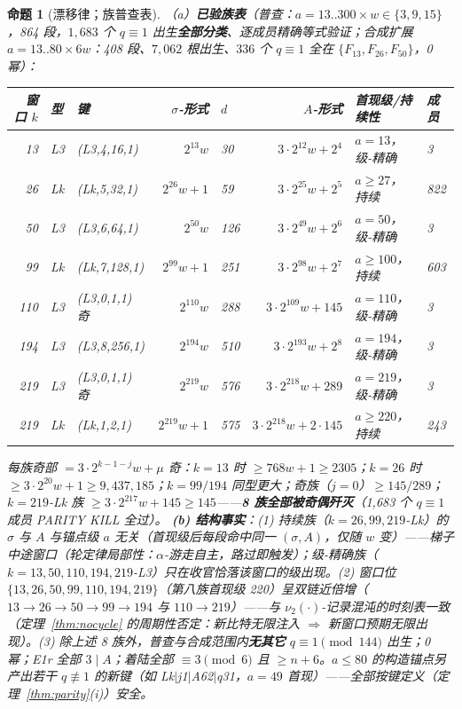 \documentclass[11pt]{ctexart}
\newtheorem{proposition}[theorem]{命题}
\theoremstyle{definition}
\newcommand{\vtwo}[1]{\nu_2(#1)}
\begin{document}
\begin{proposition}[漂移律；族普查表]\label{prop:drift}
（a）\textbf{已验族表}（普查：$a=13..300\times w\in\{3,9,15\}$，864 段，$1{,}683$ 个 $q\equiv1$ 出生\textbf{全部分类}、逐成员精确等式验证；合成扩展 $a=13..80\times6w$：408 段、$7{,}062$ 根出生、$336$ 个 $q\equiv1$ 全在 $\{F_{13},F_{26},F_{50}\}$，0 幂）：
\begin{center}\small
\begin{tabular}{rllrlrll}
\toprule
窗口 $k$ & 型 & 键 & $\sigma$-形式 & $d$ & $A$-形式 & 首现级/持续性 & 成员\\
\midrule
13 & L3 & (L3,4,16,1) & $2^{13}w$ & 30 & $3\cdot2^{12}w+2^4$ & $a{=}13$，级-精确 & 3\\
26 & Lk & (Lk,5,32,1) & $2^{26}w{+}1$ & 59 & $3\cdot2^{25}w+2^5$ & $a\ge27$，持续 & 822\\
50 & L3 & (L3,6,64,1) & $2^{50}w$ & 126 & $3\cdot2^{49}w+2^6$ & $a{=}50$，级-精确 & 3\\
99 & Lk & (Lk,7,128,1) & $2^{99}w{+}1$ & 251 & $3\cdot2^{98}w+2^7$ & $a\ge100$，持续 & 603\\
110 & L3 & (L3,0,1,1) 奇 & $2^{110}w$ & 288 & $3\cdot2^{109}w+145$ & $a{=}110$，级-精确 & 3\\
194 & L3 & (L3,8,256,1) & $2^{194}w$ & 510 & $3\cdot2^{193}w+2^8$ & $a{=}194$，级-精确 & 3\\
219 & L3 & (L3,0,1,1) 奇 & $2^{219}w$ & 576 & $3\cdot2^{218}w+289$ & $a{=}219$，级-精确 & 3\\
219 & Lk & (Lk,1,2,1) & $2^{219}w{+}1$ & 575 & $3\cdot2^{218}w+2\cdot145$ & $a\ge220$，持续 & 243\\
\bottomrule
\end{tabular}
\end{center}
每族奇部 $=3\cdot2^{k-1-j}w+\mu$ 奇：$k{=}13$ 时 $\ge768w+1\ge2305$；$k{=}26$ 时 $\ge3\cdot2^{20}w+1\ge9{,}437{,}185$；$k{=}99/194$ 同型更大；奇族（$j{=}0$）$\ge145/289$；$k{=}219$-Lk 族 $\ge3\cdot2^{217}w+145\ge145$——\textbf{8 族全部被奇偶歼灭}（1,683 个 $q\equiv1$ 成员 PARITY KILL 全过）。
\textbf{(b) 结构事实}：(1) 持续族（$k=26,99,219$-Lk）的 $\sigma$ 与 $A$ 与锚点级 $a$ 无关（首现级后每段命中同一 $(\sigma,A)$，仅随 $w$ 变）——梯子中途窗口（轮定律局部性：$\alpha$-游走自主，路过即触发）；级-精确族（$k=13,50,110,194,219$-L3）只在收官恰落该窗口的级出现。(2) 窗口位 $\{13,26,50,99,110,194,219\}$（第八族首现级 220）呈双链近倍增（$13\to26\to50\to99\to194$ 与 $110\to219$）——与 $\vtwo{\cdot}$-记录混沌的时刻表一致（定理~\ref{thm:nocycle} 的周期性否定：新比特无限注入 $\Rightarrow$ 新窗口预期无限出现）。(3) 除上述 8 族外，普查与合成范围内\textbf{无其它} $q\equiv1\pmod{144}$ 出生；0 幂；E1r 全部 $3\mid A$；着陆全部 $\equiv3\pmod6$ 且 $\ge n+6$。$a\le80$ 的构造锚点另产出若干 $q\not\equiv1$ 的新键（如 Lk$|$j1$|$A62$|$q31，$a{=}49$ 首现）——全部按键定义（定理~\ref{thm:parity}(i)）安全。

\end{proposition}
\end{document}
